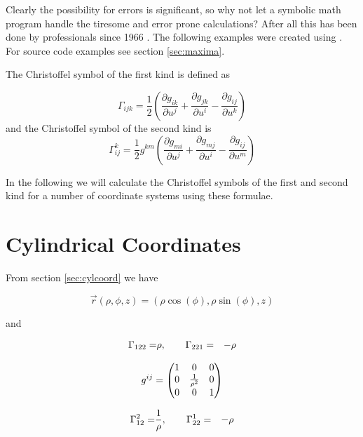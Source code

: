 Clearly the possibility for errors is significant, so why not let a symbolic math program handle the 
tiresome and error prone calculations? After all this has been done by professionals 
since 1966 \cite{misner}.  The following examples were created using 
 \cite{maxima}. For source code examples see 
section \ref{sec:maxima}.

The Christoffel symbol of the first kind is defined as 

$$
    \Gamma_{ijk} = \frac{1}{2} \left( \frac{\partial g_{ik}}{\partial u^j}  
                 +\frac{\partial g_{jk}}{\partial u^i}
                 -\frac{\partial g_{ij}}{\partial u^k}
       \right)
$$
and the Christoffel symbol of the second kind is 
$$
    \Gamma^k_{ij} = \frac{1}{2} g^{km} \left( \frac{\partial g_{mi}}{\partial u^j}  
                 +\frac{\partial g_{mj}}{\partial u^i}
                 -\frac{\partial g_{ij}}{\partial u^m}
       \right)
$$


In the following we will calculate the Christoffel symbols of the first and second kind for 
a number of coordinate systems using these formulae.


\section{Cylindrical Coordinates}

From section \ref{sec:cylcoord} we have

$$
   \vec{r}(\rho,\phi,z) = (\rho \cos(\phi), \rho \sin(\phi), z)
$$

and 



\begin{eqnarray*}
\Gamma_{122}=&\rho, \qquad \Gamma_{221}=&-\rho
\end{eqnarray*}

$$
g^{ij} = \begin{pmatrix}
   1 &      0          & 0\cr 
   0 &\frac{1}{\rho^2} & 0\cr 
   0 &      0          & 1\cr 
\end{pmatrix}
$$

\begin{eqnarray*}
\Gamma_{12}^{2}=&\frac{1}{\rho}, \qquad \Gamma_{22}^{1}=&-\rho
\end{eqnarray*}


\section{}
\label{sec:maxima_sph}

